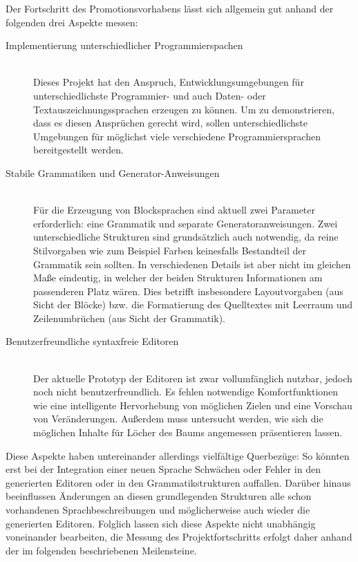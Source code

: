 \documentclass[paper=a4,fontsize=11pt,parskip=half]{scrartcl}
\begin{document}
Der Fortschritt des Promotionsvorhabens lässt sich allgemein gut anhand der folgenden drei Aspekte messen:

\begin{description}
\item[Implementierung unterschiedlicher Programmierspachen] \hfill\\
  Dieses Projekt hat den Anspruch, Entwicklungsumgebungen für unterschiedlichste Programmier- und auch Daten- oder Textauszeichnungssprachen erzeugen zu können. Um zu demonstrieren, dass es diesen Ansprüchen gerecht wird, sollen unterschiedlichste Umgebungen für möglichst viele verschiedene Programmiersprachen bereitgestellt werden.

\item[Stabile Grammatiken und Generator-Anweisungen] \hfill\\
  Für die Erzeugung von Blocksprachen sind aktuell zwei Parameter erforderlich: eine Grammatik und separate Generatoranweisungen. Zwei unterschiedliche Strukturen sind grundsätzlich auch notwendig, da reine Stilvorgaben wie zum Beispiel Farben keinesfalls Bestandteil der Grammatik sein sollten. In verschiedenen Details ist aber nicht im gleichen Maße eindeutig, in welcher der beiden Strukturen Informationen am passenderen Platz wären. Dies betrifft insbesondere Layoutvorgaben (aus Sicht der Blöcke) bzw. die Formatierung des Quelltextes mit Leerraum und Zeilenumbrüchen (aus Sicht der Grammatik).

\item[Benutzerfreundliche syntaxfreie Editoren] \hfill\\
  Der aktuelle Prototyp der Editoren ist zwar vollumfänglich nutzbar, jedoch noch nicht benutzerfreundlich. Es fehlen notwendige Komfortfunktionen wie eine intelligente Hervorhebung von möglichen Zielen und eine Vorschau von Veränderungen. Außerdem muss untersucht werden, wie sich die möglichen Inhalte für Löcher des Baums angemessen präsentieren lassen.
\end{description}

Diese Aspekte haben untereinander allerdings vielfältige Querbezüge: So könnten erst bei der Integration einer neuen Sprache Schwächen oder Fehler in den generierten Editoren oder in den Grammatikstrukturen auffallen. Darüber hinaus beeinflussen Änderungen an diesen grundlegenden Strukturen alle schon vorhandenen Sprachbeschreibungen und möglicherweise auch wieder die generierten Editoren. Folglich lassen sich diese Aspekte nicht unabhängig voneinander bearbeiten, die Messung des Projektfortschritts erfolgt daher anhand der im folgenden beschriebenen Meilensteine.
\end{document}
